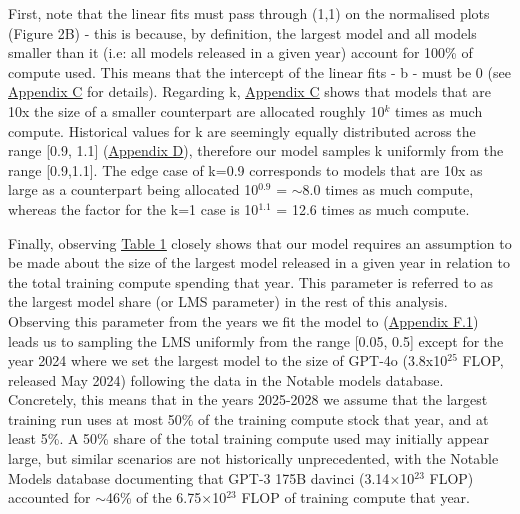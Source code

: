 \documentclass[11pt]{article}
\begin{document}
First, note that the linear fits must pass through (1,1) on the normalised plots (Figure 2B) - this is because, by definition, the largest model and all models smaller than it (i.e: all models released in a given year) account for 100\% of compute used. This means that the intercept of the linear fits - b - must be 0 (see \underline{\hyperref[appendix-c-constraints-and-interpretation-of-the-linear-fits]{Appendix C}} for details). Regarding k, \underline{\hyperref[appendix-c-constraints-and-interpretation-of-the-linear-fits]{Appendix C}} shows that models that are 10x the size of a smaller counterpart are allocated roughly 10$^k$ times as much compute. Historical values for k are seemingly equally distributed across the range [0.9, 1.1] (\underline{\hyperref[appendix-d-historical-values-of-allocation-gradients]{Appendix D}}), therefore our model samples k uniformly from the range [0.9,1.1]. The edge case of k=0.9 corresponds to models that are 10x as large as a counterpart being allocated 10$^{0.9}$ = $\sim$8.0 times as much compute, whereas the factor for the k=1 case is 10$^{1.1}$ = 12.6 times as much compute.

Finally, observing \underline{\hyperref[table-1-2023-allocations-largest-model-gemini-ultra-5x1025-flop-total-compute-1.35x1026-flop.-we-use-oom-to-refer-to-an-order-of-magnitude-of-training-compute.-allocations-may-not-sum-exactly-to-1-due-to-rounding-errors.]{Table 1}} closely shows that our model requires an assumption to be made about the size of the largest model released in a given year in relation to the total training compute spending that year. This parameter is referred to as the largest model share (or LMS parameter) in the rest of this analysis. Observing this parameter from the years we fit the model to (\underline{\hyperref[f.1-historical-lms]{Appendix F.1}}) leads us to sampling the LMS uniformly from the range [0.05, 0.5] except for the year 2024 where we set the largest model to the size of GPT-4o (3.8x10$^{25}$ FLOP, released May 2024) following the data in the Notable models database. Concretely, this means that in the years 2025-2028 we assume that the largest training run uses at most 50\% of the training compute stock that year, and at least 5\%. A 50\% share of the total training compute used may initially appear large, but similar scenarios are not historically unprecedented, with the Notable Models database documenting that GPT-3 175B davinci (3.14$\times$10$^{23}$ FLOP) accounted for $\sim$46\% of the 6.75$\times$10$^{23}$ FLOP of training compute that year.
\end{document}

